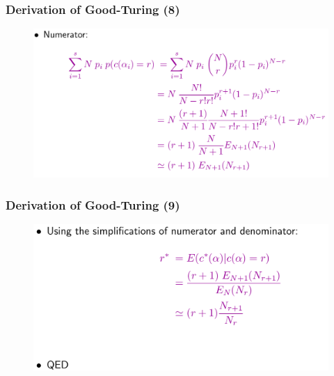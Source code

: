 \documentclass{beamer}
\begin{document}
\begin{frame}\frametitle{Derivation of Good-Turing (8)}
\begin{figure}
\includegraphics[width=0.9\linewidth]{figure/derivation_good_turing_8.pdf}
\end{figure}
\end{frame}


\begin{frame}\frametitle{Derivation of Good-Turing (9)}
\begin{figure}
\includegraphics[width=0.9\linewidth]{figure/derivation_good_turing_9.pdf}
\end{figure}
\end{frame}
\end{document}
